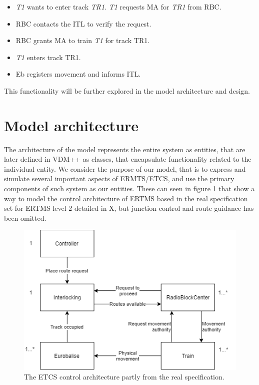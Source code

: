 \documentclass[preprint,12pt]{elsarticle}
\begin{document}
\begin{itemize}[noitemsep]
	\item \textit{T1} wants to enter track \textit{TR1}. \textit{T1} requests MA for \textit{TR1} from RBC.
	\item RBC contacts the ITL to verify the request.
	\item RBC grants MA to train \textit{T1} for track TR1.
	\item \textit{T1} enters track TR1.
	\item Eb registers movement and informs ITL.
\end{itemize}

This functionality will be further explored in the model architecture and design.

\section{Model architecture}
\label{S:systemarch}

The architecture of the model represents the entire system as entities, that are later defined in VDM++ as classes, that encapsulate functionality related to the individual entity. We consider the purpose of our model, that is to express and simulate several important aspects of ERMTS/ETCS, and use the primary components of such system as our entities. These can seen in figure \ref{fig:ertmscontrolarchitecture} that show a way to model the control architecture of ERTMS based in the real specification set for ERTMS level 2 detailed in X, but junction control and route guidance has been omitted.

\begin{figure}[h]
	\centering
	\includegraphics[width=0.8\linewidth]{ERTMSControl.png}
	\caption{The ETCS control architecture partly from the real specification.}
	\label{fig:ertmscontrolarchitecture}
\end{figure}
\end{document}
